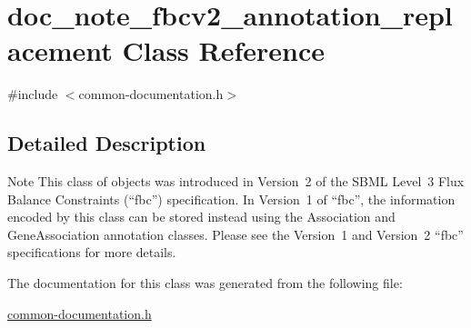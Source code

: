 \hypertarget{classdoc__note__fbcv2__annotation__replacement}{}\section{doc\+\_\+note\+\_\+fbcv2\+\_\+annotation\+\_\+replacement Class Reference}
\label{classdoc__note__fbcv2__annotation__replacement}


{\ttfamily \#include $<$common-\/documentation.\+h$>$}



\subsection{Detailed Description}
\begin{DoxyNote}{Note}
This class of objects was introduced in Version~2 of the S\+B\+ML Level~3 Flux Balance Constraints (``fbc'') specification. In Version~1 of ``fbc'', the information encoded by this class can be stored instead using the Association and Gene\+Association annotation classes. Please see the Version~1 and Version~2 ``fbc'' specifications for more details. 
\end{DoxyNote}


The documentation for this class was generated from the following file\+:\begin{DoxyCompactItemize}
\item 
\hyperlink{common-documentation_8h}{common-\/documentation.\+h}\end{DoxyCompactItemize}
